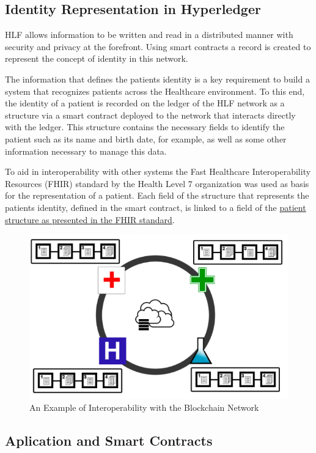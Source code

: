 \documentclass[]{llncs}
\begin{document}
\subsection{Identity Representation in Hyperledger}
 
HLF allows information to be written and read in a distributed manner with security and
privacy at the forefront. Using smart contracts a record is created to represent the concept of 
identity in this network.

The information that defines the patients identity is a key requirement to build a
system that recognizes patients across the Healthcare environment. 
To this end, the identity of a patient is recorded on the ledger of the HLF network
as a structure via a smart contract deployed to the network that interacts directly with the ledger. 
This structure contains the necessary fields to identify the patient
such as its name and birth date, for example, as well as some other information
necessary to manage this data. 

To aid in interoperability with other systems the Fast Healthcare Interoperability Resources (FHIR) 
standard by the Health Level 7 organization was used as basis for the representation of a patient. 
Each field of the structure that represents the patients identity, defined in the smart contract, 
is linked to a field of the \href{http://www.hl7.org/fhir/patient.html}{patient structure as presented in the FHIR standard}.

\begin{figure}[ht]
\centering
\includegraphics[width=0.7\linewidth]{images/interoperability.png}
\caption{\label{fig:interoperability}An Example of Interoperability with the Blockchain Network}
\end{figure}

\subsection{Aplication and Smart Contracts}
\end{document}
